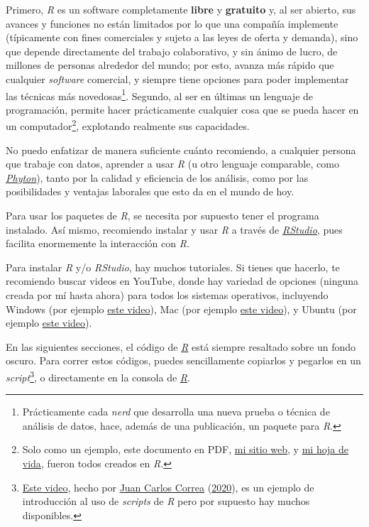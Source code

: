 \documentclass[
]{article}
\begin{document}
Primero, \emph{R} es un software completamente \textbf{libre} y
\textbf{gratuito} y, al ser abierto, sus avances y funciones no están
limitados por lo que una compañía implemente (típicamente con fines
comerciales y sujeto a las leyes de oferta y demanda), sino que depende
directamente del trabajo colaborativo, y sin ánimo de lucro, de millones
de personas alrededor del mundo; por esto, avanza más rápido que
cualquier \emph{software} comercial, y siempre tiene opciones para poder
implementar las técnicas más novedosas\footnote{Prácticamente cada
  \emph{nerd} que desarrolla una nueva prueba o técnica de análisis de
  datos, hace, además de una publicación, un paquete para \emph{R}.}.
Segundo, al ser en últimas un lenguaje de programación, permite hacer
prácticamente cualquier cosa que se pueda hacer en un
computador\footnote{Solo como un ejemplo, este documento en PDF,
  \href{https://jdleongomez.info/es/}{mi sitio web}, y
  \href{https://jdleongomez.info/es/files/jdl_cv_es.pdf}{mi hoja de
  vida}, fueron todos creados en \emph{R}.}, explotando realmente sus
capacidades.

No puedo enfatizar de manera suficiente cuánto recomiendo, a cualquier
persona que trabaje con datos, aprender a usar \emph{R} (u otro lenguaje
comparable, como \href{https://www.python.org/}{\emph{Phyton}}), tanto
por la calidad y eficiencia de los análisis, como por las posibilidades
y ventajas laborales que esto da en el mundo de hoy.

Para usar los paquetes de \emph{R}, se necesita por supuesto tener el
programa instalado. Así mismo, recomiendo instalar y usar \emph{R} a
través de \href{https://rstudio.com/}{\emph{RStudio}}, pues facilita
enormemente la interacción con \emph{R}.

Para instalar \emph{R} y/o \emph{RStudio}, hay muchos tutoriales. Si
tienes que hacerlo, te recomiendo buscar videos en YouTube, donde hay
variedad de opciones (ninguna creada por mí hasta ahora) para todos los
sistemas operativos, incluyendo Windows (por ejemplo
\href{https://www.youtube.com/watch?v=D9Bp11iZssc}{este video}), Mac
(por ejemplo \href{https://www.youtube.com/watch?v=UCPr3W_wR5I}{este
video}), y Ubuntu (por ejemplo
\href{https://www.youtube.com/watch?v=PFlLatx5mlQ}{este video}).

En las siguientes secciones, el código de
\href{https://www.r-project.org/}{\emph{R}} está siempre resaltado sobre
un fondo oscuro. Para correr estos códigos, puedes sencillamente
copiarlos y pegarlos en un \emph{script}\footnote{\href{https://youtu.be/ejQ0BS2gVJI}{Este
  video}, hecho por
  \href{https://docentes.konradlorenz.edu.co/2019/06/juan-carlos-correa.html}{Juan
  Carlos Correa} (\protect\hyperlink{ref-correaScriptsVideo2020}{2020}),
  es un ejemplo de introducción al uso de \emph{scripts} de \emph{R}
  pero por supuesto hay muchos disponibles.}, o directamente en la
consola de \href{https://www.r-project.org/}{\emph{R}}.
\end{document}
